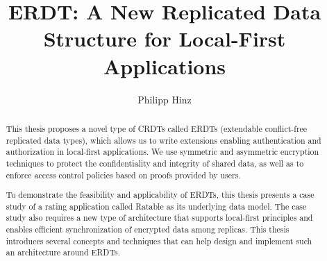 \documentclass[
	english,
	ruledheaders=section,   %
	class=report,		    %
	thesis={type=bachelor}, %
	accentcolor=9c,			%
	custommargins=true,    %
	marginpar=false,        %
	parskip=half-,          %
	fontsize=11pt,          %
]{tudapub}
\begin{document}

\title{ERDT: A New Replicated Data Structure for Local-First Applications}
\author[P. Hinz]{Philipp Hinz} %



\submissiondate{\today}
\examdate{\today}

\maketitle

\affidavit

\tableofcontents

\begin{abstract}
This thesis proposes a novel type of CRDTs called ERDTs (extendable conflict-free replicated data types), which allows us to write extensions enabling authentication and authorization in local-first applications. We use symmetric and asymmetric encryption techniques to protect the confidentiality and integrity of shared data, as well as to enforce access control policies based on proofs provided by users.

To demonstrate the feasibility and applicability of ERDTs, this thesis presents a case study of a rating application called Ratable as its underlying data model. The case study also requires a new type of architecture that supports local-first principles and enables efficient synchronization of encrypted data among replicas. This thesis introduces several concepts and techniques that can help design and implement such an architecture around ERDTs.
\end{abstract}
\end{document}

